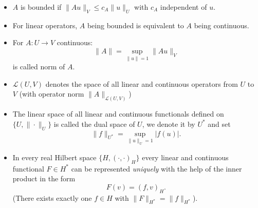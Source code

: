 \documentclass[../skript.tex]{subfiles}
\begin{document}
\begin{itemize}
\[\]
\item $A$ is bounded if $\| A u \|_V \leq c_A \| u \|_U$ with $c_A$ independent of $u$.
\item For linear operators, $A$ being bounded is equivalent to $A$ being continuous.
\item For $A : U \to V$ continuous:
\[
	\| A \| = \sup_{\| u \| = 1} \| A u \|_V
\]
is called norm of $A$.
\item $\mathcal{L}(U, V)$ denotes the space of all linear and continuous operators from $U$ to $V$ (with operator norm $\|A\|_{\mathcal{L}(U, V)}$)
\item The linear space of all linear and continuous functionals defined on $\{ U, \| \cdot \|_U \}$ is called the dual space of $U$, we denote it by $U^*$ and set
\[
	\| f \|_{U^*} = \sup_{\| u \|_U = 1} |f(u)|.
\]
\item In every real Hilbert space $\{ H, (\cdot, \cdot)_H \}$ every linear and continuous functional $F \in H^*$ can be represented \emph{uniquely} with the help of the inner product in the form
\[
F(v) = (f, v)_H.
\]
(There exists exactly one $f \in H$ with $\|F\|_{H^*} = \| f \|_{H^*}$).
\end{itemize}
\end{document}
